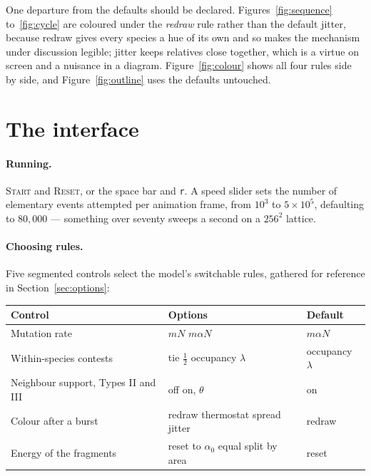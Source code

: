 \documentclass[11pt,a4paper]{article}
\newcommand{\code}[1]{\texttt{#1}}
\begin{document}
One departure from the defaults should be declared. Figures~\ref{fig:sequence}
to~\ref{fig:cycle} are coloured under the \emph{redraw} rule rather than the default jitter,
because redraw gives every species a hue of its own and so makes the mechanism under
discussion legible; jitter keeps relatives close together, which is a virtue on screen and a
nuisance in a diagram. Figure~\ref{fig:colour} shows all four rules side by side, and
Figure~\ref{fig:outline} uses the defaults untouched.

\section{The interface}
\label{sec:interface}

\paragraph{Running.} \textsc{Start} and \textsc{Reset}, or the space bar and \code{r}. A
speed slider sets the number of elementary events attempted per animation frame, from
$10^3$ to $5\times10^5$, defaulting to $80{,}000$ --- something over seventy sweeps a
second on a $256^2$ lattice.

\paragraph{Choosing rules.} Five segmented controls select the model's switchable rules,
gathered for reference in Section~\ref{sec:options}:

\begin{center}
\begin{tabular}{lll}
\toprule
Control & Options & Default \\
\midrule
Mutation rate                 & $mN$ \textbar{} $m\alpha N$ & $m\alpha N$ \\
Within-species contests       & tie $\tfrac12$ \textbar{} occupancy $\lambda$ & occupancy $\lambda$ \\
Neighbour support, Types II and III & off \textbar{} on, $\theta$ & on \\
Colour after a burst          & redraw \textbar{} thermostat \textbar{} spread \textbar{} jitter & redraw \\
Energy of the fragments       & reset to $\alpha_0$ \textbar{} equal split \textbar{} by area & reset \\
\bottomrule
\end{tabular}
\end{center}
\end{document}
